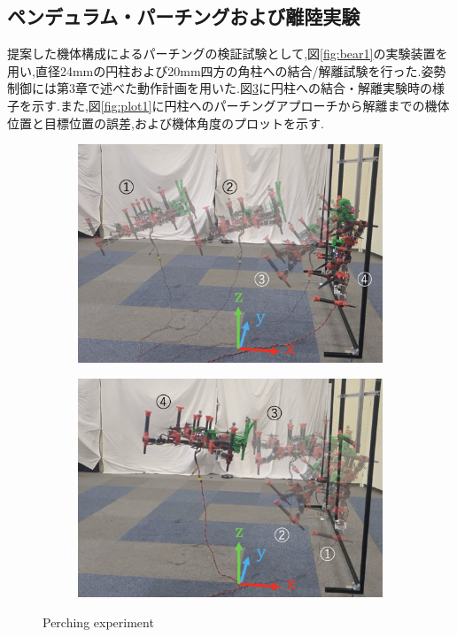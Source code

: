 \documentclass{jarticle}
\begin{document}
\subsection{ペンデュラム・パーチングおよび離陸実験}
提案した機体構成によるパーチングの検証試験として,図\ref{fig:bear1}の実験装置を用い,直径24mmの円柱および20mm四方の角柱への結合/解離試験を行った.姿勢制御には第3章で述べた動作計画を用いた.図\ref{fig:perching}に円柱への結合・解離実験時の様子を示す.また,図\ref{fig:plot1}に円柱へのパーチングアプローチから解離までの機体位置と目標位置の誤差,および機体角度のプロットを示す.
\vspace{-2mm}
\begin{figure}[H]
  \centering
  \begin{subfigure}{0.38\columnwidth}
    \includegraphics[width=\textwidth]{figs/attaching.eps}
    \vspace{-6mm}
    \caption{}
    \label{fig:perching1}
  \end{subfigure}
  \begin{subfigure}{0.38\columnwidth}
    \includegraphics[width=\textwidth]{figs/detaching.eps}
    \vspace{-6mm}
    \caption{}
    \label{fig:perching2}
  \end{subfigure}
  \vspace{1mm}
  \caption{Perching experiment}
  \label{fig:perching}
  \vspace{-6mm}
\end{figure}
\end{document}
